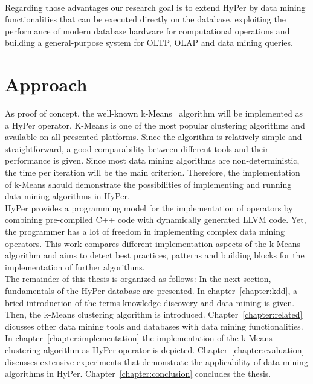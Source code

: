 \\
Regarding those advantages our research goal is to extend HyPer by data mining functionalities that can be executed directly on the database, exploiting the performance of modern database hardware for computational operations and building a general-purpose system for OLTP, OLAP and data mining queries. 


\section{Approach}
As proof of concept, the well-known k-Means~\parencite{kMeans} algorithm will be implemented as a HyPer operator. K-Means is one of the most popular  clustering algorithms and available on all presented platforms. Since the algorithm is relatively simple and straightforward, a good comparability between different tools and their performance is given. Since most data mining algorithms are non-deterministic, the time per iteration will be the main criterion. Therefore, the implementation of k-Means should demonstrate the possibilities of implementing and running data mining algorithms in HyPer.
\\
HyPer provides a programming model for the implementation of operators by combining pre-compiled C++ code with dynamically generated LLVM code. Yet, the programmer has a lot of freedom in implementing complex data mining operators. This work compares different implementation aspects of the k-Means algorithm and aims to detect best practices, patterns and building blocks for the implementation of further algorithms.
\\
The remainder of this thesis is organized as follows: In the next section, fundamentals of the HyPer database are presented. In chapter~\ref{chapter:kdd}, a bried introduction of the terms knowledge discovery and data mining is given. Then, the k-Means clustering algorithm is introduced. Chapter~\ref{chapter:related} dicusses other data mining tools and databases with data mining functionalities. In chapter~\ref{chapter:implementation} the implementation of the k-Means clustering algorithm as HyPer operator is depicted. Chapter~\ref{chapter:evaluation} discusses extensive experiments that demonstrate the applicability of data mining algorithms in HyPer. Chapter~\ref{chapter:conclusion} concludes the thesis.



